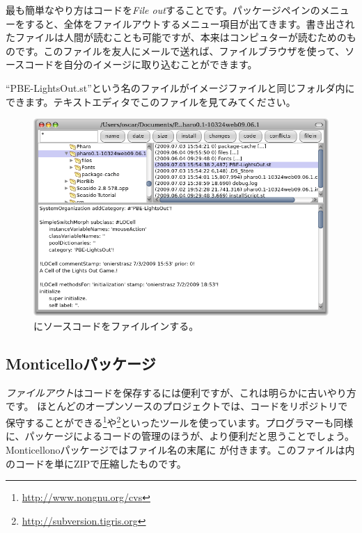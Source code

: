 \documentclass[a4paper,10pt,twoside]{book}
\begin{document}
最も簡単なやり方はコードを\emph{File out}することです。パッケージペインのメニューを\actclick すると、全体をファイルアウトするメニュー項目が出てきます。書き出されたファイルは人間が読むことも可能ですが、本来はコンピュターが読むためのものです。このファイルを友人にメールで送れば、ファイルブラウザを使って、ソースコードを自分の\pharo イメージに取り込むことができます。


``PBE-LightsOut.st''という名のファイルがイメージファイルと同じフォルダ内にできます。テキストエディタでこのファイルを見てみてください。


\begin{figure}[ht]
\centerline {\includegraphics[width=\textwidth]{FileIn}}
\caption{\pharo にソースコードをファイルインする。
}
\end{figure}

\subsection{Monticelloパッケージ}
\emph{ファイルアウト}はコードを保存するには便利ですが、これは明らかに古いやり方です。
ほとんどのオープンソースのプロジェクトでは、コードをリポジトリで保守することができる\footnote{\url{http://www.nongnu.org/cvs}}や\footnote{\url{http://subversion.tigris.org}}といったツールを使っています。\pharo プログラマーも同様に、パッケージによるコードの管理のほうが、より便利だと思うことでしょう。Monticellonoパッケージではファイル名の末尾に が付きます。このファイルは内のコードを単にZIPで圧縮したものです。
\end{document}
